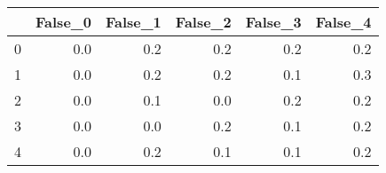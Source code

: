 \begin{tabular}{lrrrrr}
\toprule
{} &  False\_0 &  False\_1 &  False\_2 &  False\_3 &  False\_4 \\ \hline
\midrule
0 &      0.0 &      0.2 &      0.2 &      0.2 &      0.2 \\ \hline
1 &      0.0 &      0.2 &      0.2 &      0.1 &      0.3 \\ \hline
2 &      0.0 &      0.1 &      0.0 &      0.2 &      0.2 \\ \hline
3 &      0.0 &      0.0 &      0.2 &      0.1 &      0.2 \\ \hline
4 &      0.0 &      0.2 &      0.1 &      0.1 &      0.2 \\ \hline
\bottomrule
\end{tabular}
